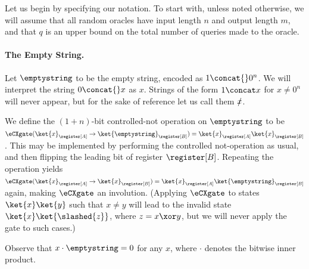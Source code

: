     Let us begin by specifying our notation. To start with, unless noted otherwise,
      we will assume that all random oracles have input length $n$ and
      output length $m$, and that $q$ is an upper bound on the total
      number of queries made to the oracle.

    \paragraph{The Empty String.}
       Let $\emptystring$ to be the empty string, encoded
        as $1 \concat{}0^n$. We will interpret the string $0 \concat{}x$ as $x$.
        Strings of the form $1 \concat x$ for $x \neq 0^n$ will never
        appear, but for the sake of reference let us call them $\slashed{x}$.

      We define the $(1+n)$-bit controlled-not operation on $\emptystring$ to be
        $\eCXgate(\ket{x}_{\register[A]} \to \ket{\emptystring}_{\register[B]})
        = \ket{x}_{\register[A]}\ket{x}_{\register[B]}$.
        This may be implemented by performing the controlled not-operation as usual,
        and then flipping the leading bit of register $\register[B]$. Repeating the
        operation yields $\eCXgate(\ket{x}_{\register[A]} \to
        \ket{x}_{\register[B]}) =
        \ket{x}_{\register[A]}\ket{\emptystring}_{\register[B]}$ again, making
        $\eCXgate$ an involution.
        (Applying $\eCXgate$ to states $\ket{x}\ket{y}$ such that $x \neq y$
        will lead to the invalid state $\ket{x}\ket{\slashed{z}}$, where $z = x \xor
        y$, but we will never apply the gate to such cases.)

      Observe that $x \cdot \emptystring = 0$ for any $x$, where $\cdot$
        denotes the bitwise inner product.

